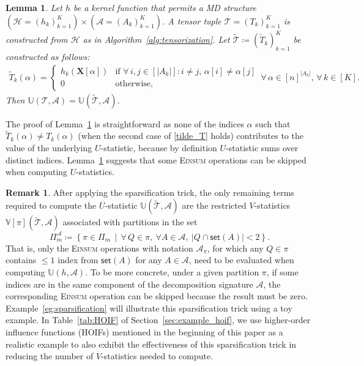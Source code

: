 \documentclass[12pt]{article}
\theoremstyle{plain}
\newtheorem{lemma}{Lemma}
\theoremstyle{definition}
\newtheorem{remark}{Remark}
\def\tilde{\widetilde}
\def\Einsum{\textsc{Einsum}}
\newcommand{\ustat}{\mathbb{U}}
\newcommand{\vstat}{\mathbb{V}}
\newcommand{\takesetp}[1]{\mathsf{set}(#1)}
\newcommand{\partition}{\Pi}
\newcommand{\partitionp}[1]{\partition_{#1}}
\def\calA{\mathcal{A}}
\def\calT{\mathcal{T}}
\def\calH{\mathcal{H}}
\begin{document}
\begin{bibunit}[agsm]
\begin{lemma}\label{lem:sparsification_trick}
Let $h$ be a kernel function that permits a MD structure $(\calH = (h_k)_{k=1}^K) \times (\calA = (A_k)_{k=1}^K)$. A tensor tuple $\calT = (T_k)_{k = 1}^{K}$ is constructed from $\calH$ as in Algorithm~\ref{alg:tensorization}. Let $\tilde{\calT} \coloneqq (\tilde{T}_k)_{k=1}^K$ be constructed as follows:
\begin{equation}
\label{tilde_T}
\begin{split}
\tilde{T}_k (\alpha) = 
\begin{cases}
h_k (\bm{X}[\alpha]) & \text{if } \forall \, i,j \in [|A_k|]: i \neq j, \, \alpha [i] \neq \alpha [j] \\
0 & \text{otherwise}, 
\end{cases}
\, \forall \, \alpha \in [n]^{|A_k|}, \, \forall \, k \in [K]. 
\end{split}
\end{equation}
Then $\ustat(\calT, \calA) = \ustat(\tilde{\calT}, \calA)$.
\end{lemma}

The proof of Lemma~\ref{lem:sparsification_trick} is straightforward as none of the indices $\alpha$ such that $\tilde{T}_{k} (\alpha) \neq T_{k} (\alpha)$ (when the second case of \eqref{tilde_T} holds) contributes to the value of the underlying $U$-statistic, because by definition $U$-statistic sums over distinct indices. Lemma~\ref{lem:sparsification_trick} suggests that some \Einsum{} operations can be skipped when computing $U$-statistics.

\begin{remark}\label{rem:sparsification_terms_revised}
After applying the sparsification trick, the only remaining terms required to compute the $U$-statistic $\ustat(\widetilde{\calT}, \calA)$ are the restricted $V$-statistics $\vstat[\pi](\widetilde{\calT}, \calA)$ associated with partitions in the set
\begin{equation}
\label{eq:quotient_set}
\partition_m^\calA \coloneqq \left\{ \pi \in \partitionp{m} \,\middle|\, \forall \, Q \in \pi,\ \forall A \in \calA,\ |Q \cap \takesetp{A}| < 2 \right\}.
\end{equation}
That is, only the \Einsum{} operations with notation $\calA_\pi$, for which any $Q \in \pi$ contains $\leq 1$ index from $\takesetp{A}$ for any $A \in \calA$, need to be evaluated when computing $\ustat(h, \calA)$.  To be more concrete, under a given partition $\pi$, if some indices are in the same component of the decomposition signature $\calA$, the corresponding \Einsum{} operation can be skipped because the result must be zero. Example~\ref{eg:sparsification} will illustrate this sparsification trick using a toy example. In Table~\ref{tab:HOIF} of Section~\ref{sec:example_hoif}, we use higher-order influence functions (HOIFs) mentioned in the beginning of this paper as a realistic example to also exhibit the effectiveness of this sparsification trick in reducing the number of $V$-statistics needed to compute.
\end{remark}


\end{bibunit}
\end{document}
